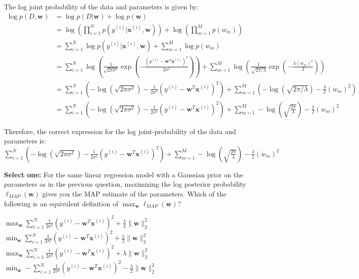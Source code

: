 \documentclass[11pt,addpoints,answers]{exam}
\newcommand{\sone}{\textbf{Select one: }}
\begin{document}
\begin{questions}
\begin{parts}
\begin{subparts}
     \begin{your_solution}[title=Work,height=15cm]
        The log joint probability of the data and parameters is given by:
\begin{align*}
\log p(D, \mathbf{w}) &= \log p(D|\mathbf{w}) + \log p(\mathbf{w})\\
&= \log \left(\prod_{i=1}^N p(y^{(i)}|\mathbf{x}^{(i)}, \mathbf{w})\right) + \log \left(\prod_{m=1}^M p(w_m)\right)\\
&= \sum_{i=1}^N\log p(y^{(i)}|\mathbf{x}^{(i)}, \mathbf{w}) + \sum_{m=1}^M\log p(w_m)\\
&= \sum_{i=1}^N\log \left(\frac{1}{\sqrt{2\pi\sigma^2}}\exp\left(-\frac{(y^{(i)} - \mathbf{w}^T\mathbf{x}^{(i)})^2}{2\sigma^2}\right)\right) + \sum_{m=1}^M\log \left(\frac{1}{\sqrt{2\pi/\lambda}}\exp\left(-\frac{\lambda (w_m)^2}{2}\right)\right)\\
&= \sum_{i=1}^N\left(-\log (\sqrt{2\pi\sigma^2}) - \frac{1}{2\sigma^2} (y^{(i)} - \mathbf{w}^T\mathbf{x}^{(i)})^2\right) + \sum_{m=1}^M\left(-\log(\sqrt{2\pi/\lambda}) - \frac{\lambda}{2}(w_m)^2\right)\\
&= \sum_{i=1}^N\left(-\log (\sqrt{2\pi\sigma^2}) - \frac{1}{2\sigma^2} (y^{(i)} - \mathbf{w}^T\mathbf{x}^{(i)})^2\right) + \sum_{m=1}^M -\log(\sqrt{\frac{2\pi}{\lambda}}) - \frac{\lambda}{2}(w_m)^2
\end{align*}

Therefore, the correct expression for the log joint-probability of the data and parameters is:
        $\sum_{i=1}^N\left(-\log (\sqrt{2\pi\sigma^2}) - \frac{1}{2\sigma^2} (y^{(i)} - \mathbf{w}^T\mathbf{x}^{(i)})^2\right) + \sum_{m=1}^M -\log(\sqrt{\frac{2\pi}{\lambda}}) - \frac{\lambda}{2}(w_m)^2$
    \end{your_solution}
        
    
    \newpage
    \subpart[2] \sone For the same linear regression model with a Gaussian prior on the parameters as in the previous question, maximizing the log posterior probability  $\ell_{\textit{MAP}}(\mathbf{w})$ gives you the MAP estimate of the parameters.
    Which of the following is an equivalent definition of  $\max_{\mathbf{w}} \ell_{\textit{MAP}}(\mathbf{w})$?
    \begin{checkboxes}
        \choice $\max_{\mathbf{w}} \sum_{i=1}^N\frac{1}{2\sigma^2} (y^{(i)} - \mathbf{w}^T\mathbf{x}^{(i)})^2 + \frac{\lambda}{2}\|\mathbf{w}\|_2^2$
        \CorrectChoice $\min_{\mathbf{w}} \sum_{i=1}^N\frac{1}{2\sigma^2} (y^{(i)} - \mathbf{w}^T\mathbf{x}^{(i)})^2 + \frac{\lambda}{2}\|\mathbf{w}\|_2^2$
        \choice $\max_{\mathbf{w}} \sum_{i=1}^N\frac{1}{2\sigma^2} (y^{(i)} - \mathbf{w}^T\mathbf{x}^{(i)})^2 + \lambda\|\mathbf{w}\|_2^2$
        \choice $\min_{\mathbf{w}} - \sum_{i=1}^N\frac{1}{2\sigma^2} (y^{(i)} - \mathbf{w}^T\mathbf{x}^{(i)})^2 - \frac{\lambda}{2}\|\mathbf{w}\|_2^2$
    \end{checkboxes}
    

\end{subparts}
\end{parts}
\end{questions}
\end{document}
